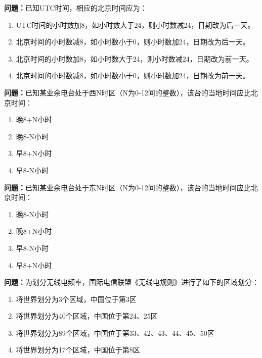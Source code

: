 \bigskip


\noindent\textbf{问题：}已知UTC时间，相应的北京时间应为：
\begin{enumerate}[label=\Alph*), leftmargin=3em]
\item UTC时间的小时数加8，如小时数大于24，则小时数减24，日期改为后一天。
\item 北京时间的小时数减8，如小时数小于0，则小时数加24，日期改为后一天。
\item 北京时间的小时数加8，如小时数大于24，则小时数减24，日期改为前一天。
\item 北京时间的小时数减8，如小时数小于0，则小时数加24，日期改为前一天。
\end{enumerate}

\bigskip


\noindent\textbf{问题：}已知某业余电台处于西N时区（N为0-12间的整数），该台的当地时间应比北京时间：
\begin{enumerate}[label=\Alph*), leftmargin=3em]
\item 晚8+N小时
\item 晚8-N小时
\item 早8+N小时
\item 早8-N小时
\end{enumerate}

\bigskip


\noindent\textbf{问题：}已知某业余电台处于东N时区（N为0-12间的整数），该台的当地时间应比北京时间：
\begin{enumerate}[label=\Alph*), leftmargin=3em]
\item 晚8-N小时
\item 晚8+N小时
\item 早8-N小时
\item 早8+N小时
\end{enumerate}

\bigskip


\noindent\textbf{问题：}为划分无线电频率，国际电信联盟《无线电规则》进行了如下的区域划分：
\begin{enumerate}[label=\Alph*), leftmargin=3em]
\item 将世界划分为3个区域，中国位于第3区
\item 将世界划分为40个区域，中国位于第24、25区
\item 将世界划分为89个区域，中国位于第33、42、43、44、45、50区
\item 将世界划分为17个区域，中国位于第8区
\end{enumerate}

\bigskip


